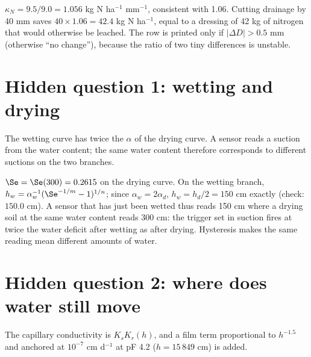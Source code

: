 \sol  $\kappa_N=9.5/9.0=1.056$ kg N ha$^{-1}$ mm$^{-1}$, consistent with 1.06. Cutting drainage by 40 mm saves $40\times1.06=42.4$ kg N ha$^{-1}$, equal to a dressing of 42 kg of nitrogen that would otherwise be leached. The row is printed only if $|\Delta D|>0.5$ mm (otherwise ``no change''), because the ratio of two tiny differences is unstable.


\section{Hidden question 1: wetting and drying}
The wetting curve has twice the $\alpha$ of the drying curve. A sensor reads a suction from the water content; the same water content therefore corresponds to different suctions on the two branches.

\sol  $\Se=\Se(300)=0.2615$ on the drying curve. On the wetting branch, $h_w=\alpha_w^{-1}(\Se^{-1/m}-1)^{1/n}$; since $\alpha_w=2\alpha_d$, $h_w=h_d/2=150$ cm exactly (check: $150.0$ cm). A sensor that has just been wetted thus reads 150 cm where a drying soil at the same water content reads 300 cm: the trigger set in suction fires at twice the water deficit after wetting as after drying. Hysteresis makes the same reading mean different amounts of water.


\section{Hidden question 2: where does water still move}
The capillary conductivity is $K_s K_r(h)$, and a film term proportional to $h^{-1.5}$ and anchored at $10^{-7}$ cm d$^{-1}$ at pF 4.2 ($h=15\,849$ cm) is added.

